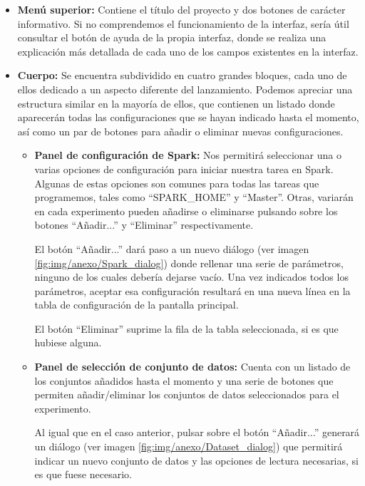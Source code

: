 \begin{itemize}
	\item \textbf{Menú superior:} Contiene el título del proyecto y dos botones de carácter informativo. Si no comprendemos el funcionamiento de la interfaz, sería útil consultar el botón de ayuda de la propia interfaz, donde se realiza una explicación más detallada de cada uno de los campos existentes en la interfaz.
	\item \textbf{Cuerpo:} Se encuentra subdividido en cuatro grandes bloques, cada uno de ellos dedicado a un aspecto diferente del lanzamiento. Podemos apreciar una estructura similar en la mayoría de ellos, que contienen un listado donde aparecerán todas las configuraciones que se hayan indicado hasta el momento, así como un par de botones para añadir o eliminar nuevas configuraciones.
		\begin{itemize}
			\item \textbf{Panel de configuración de Spark:} Nos permitirá seleccionar una o varias opciones de configuración para iniciar nuestra tarea en Spark. Algunas de estas opciones son comunes para todas las tareas que programemos, tales como ``SPARK\_HOME'' y ``Master''. Otras, variarán en cada experimento pueden añadirse o eliminarse pulsando sobre los botones ``Añadir...'' y ``Eliminar'' respectivamente.
			
			El botón ``Añadir...'' dará paso a un nuevo diálogo (ver imagen \ref{fig:img/anexo/Spark_dialog}) donde rellenar una serie de parámetros, ninguno de los cuales debería dejarse vacío. Una vez indicados todos los parámetros, aceptar esa configuración resultará en una nueva línea en la tabla de configuración de la pantalla principal.
			
			El botón ``Eliminar'' suprime la fila de la tabla seleccionada, si es que hubiese alguna.
			
			
			\item \textbf{Panel de selección de conjunto de datos:} Cuenta con un listado de los conjuntos añadidos hasta el momento y una serie de botones que permiten añadir/eliminar los conjuntos de datos seleccionados para el experimento.
			
			Al igual que en el caso anterior, pulsar sobre el botón ``Añadir...'' generará un diálogo (ver imagen \ref{fig:img/anexo/Dataset_dialog}) que permitirá indicar un nuevo conjunto de datos y las opciones de lectura necesarias, si es que fuese necesario.
						

\end{itemize}
\end{itemize}
